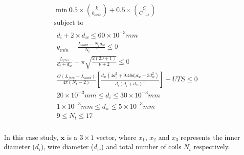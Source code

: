 \documentclass[10pt]{article}
\begin{document}
				\begin{equation}
					\begin{gathered}
	 					\min_{} 0.5 \times\left(\frac{k}{k_{max}}\right) + 0.5 \times (\frac{C}{C_{max}}) \\
	 					\mbox{subject to} \\%
						\begin{split}
							 d_{i} + 2 \times d_{w} \leq 60 \times 10^{-3} mm\\
							 g_{min} - \frac{L_{hard} - N_{t}d_{w}}{N_{t}-1} \leq 0\\
							 \frac{L_{free}}{d_{i} + d_{w}} - \pi \sqrt{\frac{2(2 \nu + 1)}{\nu + 2}} \leq 0\\
							 \frac{G(L_{free} - L_{hard})}{4 \pi (N_{t} - 2) } \left[\frac{d_{w} (4d_{i}^{2} + 9.46d_{i} d_{w} + 3 d_{w}^{2})}{d_{i}(d_{i}+d_{w})^{3}}\right] - UTS \leq 0\\
							 20 \times 10^{-3} mm \leq d_{i} \leq 30 \times 10^{-3} mm\\	 
							 1 \times 10^{-3} mm \leq d_{w} \leq 5 \times 10^{-3} mm\\	 
							 9 \leq N_{t} \leq 17\\	 
						\end{split}
					\end{gathered}
					\label{eq:Case_1_Problem_Definition}	
				\end{equation}
	
    
\begin{flushleft}
In this case study, $\textbf{x}$ is a $3 \times 1$ vector, where $x_{1}$, $x_{2}$ and $x_{3}$ represents the inner diameter ($d_{i}$), wire diameter ($d_{w}$) and total number of coils $N_{t}$ respectively.

\end{flushleft}
    
\end{document}
